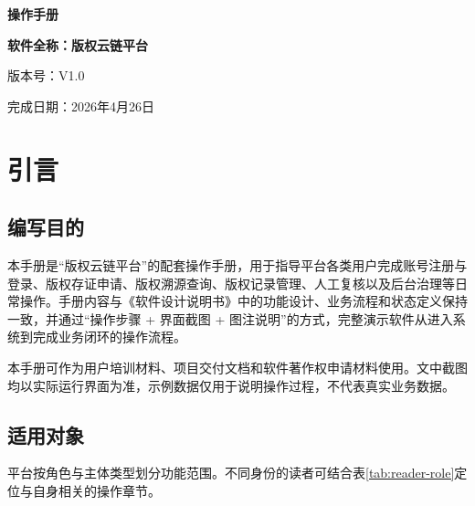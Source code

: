 \documentclass[UTF8,a4paper,12pt]{ctexart}
\begin{document}
\songti
{}

\begin{titlepage}
  \centering
  \vspace*{2.5cm}
  {\songti{}\bfseries 操作手册\par}
  \vspace{1.1cm}
  {\songti{}\bfseries 软件全称：版权云链平台\par}
  \vspace{0.5cm}
  {\songti{}版本号：V1.0\par}
  \vspace{2.2cm}

  \begin{center}
    \songti{}
    完成日期：2026年4月26日
  \end{center}

  \vfill
\end{titlepage}

\newpage
{}
\tableofcontents
\newpage
{}
\setcounter{page}{1}

\section{引言}

\subsection{编写目的}
\indent 本手册是“版权云链平台”的配套操作手册，用于指导平台各类用户完成账号注册与登录、版权存证申请、版权溯源查询、版权记录管理、人工复核以及后台治理等日常操作。手册内容与《软件设计说明书》中的功能设计、业务流程和状态定义保持一致，并通过“操作步骤 + 界面截图 + 图注说明”的方式，完整演示软件从进入系统到完成业务闭环的操作流程。\par

\indent 本手册可作为用户培训材料、项目交付文档和软件著作权申请材料使用。文中截图均以实际运行界面为准，示例数据仅用于说明操作过程，不代表真实业务数据。\par

\subsection{适用对象}
\indent 平台按角色与主体类型划分功能范围。不同身份的读者可结合表\ref{tab:reader-role}定位与自身相关的操作章节。\par
\end{document}
